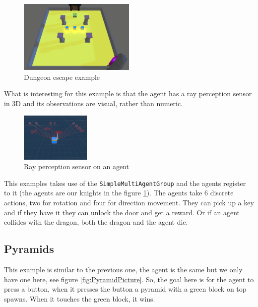 \documentclass[a4paper, 12pt]{book}
\begin{document}
\begin{figure}[h]
\begin{center}
\includegraphics[width=0.5\textwidth]{Images/DungeonEscape.png}
\end{center}
\caption{Dungeon escape example \cite{MLAgents}}
\label{pic11}
\end{figure}

What is interesting for this example is that the agent has a ray perception sensor in 3D and its observations are visual, rather than numeric.

\begin{figure}[h]
\begin{center}
\includegraphics[width=0.3\textwidth]{Images/AgentDungeonEscape.png}
\end{center}
\caption{Ray perception sensor on an agent}
\label{pic12}
\end{figure}

This examples takes use of the \texttt{SimpleMultiAgentGroup} and the agents register to it (the agents are our knights in the figure \ref{pic11}). The agents take 6 discrete actions, two for rotation and four for direction movement. They can pick up a key and if they have it they can unlock the door and get a reward. Or if an agent collides with the dragon, both the dragon and the agent die.

\subsection{Pyramids}

This example is similar to the previous one, the agent is the same but we only have one here, see figure \ref{fig:PyramidPicture}. So, the goal here is for the agent to press a button, when it presses the button a pyramid with a green block on top spawns. When it touches the green block, it wins.
\end{document}
